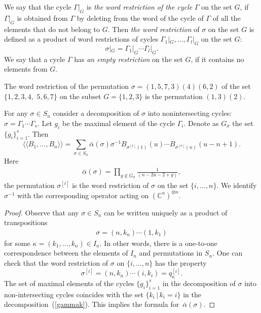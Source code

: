 \documentclass[pdftex]{sigma}
\newcommand{\CC}{\mathbb C}    %
\begin{document}
\begin{definition}
We say that the cycle $\Gamma |_G$ is {\it {the word restriction of  the cycle}}  $\Gamma$ on the set $G$, if~$\Gamma |_G$ is obtained from $\Gamma$ by deleting   from the  word of the cycle of $\Gamma$ of all the elements that do not belong to  $G$.
Then {\it {the word restriction}} of $\sigma$ on the set $G$ is def\/ined as a product of word restrictions of cycles $\Gamma_1|_G, \dots, \Gamma_l|_G $ on the set $G$:
\[
\sigma|_G=
\Gamma_1|_G \cdots \Gamma_l|_G.
\]
We say that a cycle $\Gamma$  has {\it{an empty restriction}} on the set $G$, if it contains no elements from $G$.
 \end{definition}
 \begin{example} The word restriction of the permutation $\sigma =(1,5,7,3)(4)(6,2)$ of the set $\{1,2,3,4,$ $5,6,7\}$ on the subset $G=\{1,2,3\}$
 is  the permutation $(1,3)(2)$.
 \end{example}

\begin{proposition}\label{QC}  For any  $\sigma\in S_n$ consider  a decomposition of $\sigma$  into nonintersecting cycles:
$\sigma = \Gamma_1\cdots \Gamma_s$.
Let $g_i$ be the maximal element of the cycle $\Gamma_i$.   Denote as $G_\sigma$ the set $\{g_i\}_{i=1}^{s}$.
Then
\[
\langle \langle B_1,\dots, B_n\rangle \rangle
=\sum_{\sigma \in S_n }\bar\alpha{(\sigma)} \sigma^{-1} B_{\sigma^{[1]}(1)}(u)\cdots B_{\sigma^{[n]}(n)}(u-n+1).
\]
Here
\begin{gather*}%
\bar\alpha{(\sigma)}=
\prod_{g\notin G_\sigma} \frac{1}{ (n-2u-2+g)},
\end{gather*}
the permutation $\sigma^{[i]}$ is the word restriction of  $\sigma$ on the set $\{i, \dots, n\}$. We identify $\sigma^{-1}$  with the corresponding operator acting on $(\CC^n)^{\otimes n}$.
\end{proposition}


\begin{proof}
Observe that any $\sigma\in S_n $ can be written  uniquely as a product of transpositions
\begin{gather}\label{gammak}
\sigma=(n,k_n)\cdots (1,k_1)
\end{gather}
 for some $\kappa=(k_1,\dots, k_n)\in I_n$. In other words, there  is a one-to-one correspondence between the elements of $I_n$  and permutations in $S_n$. One can check that the word restriction  of $\sigma$ on $\{i,\dots,n\}$  has the property
\[
\sigma^{[i]}=(n,k_n)\cdots (i,k_i)=q^{[i]}_{\kappa}.
\]
The set of   maximal elements  of the cycles  $\{g_{i}\}_{i=1}^{s}$  in the decomposition of $\sigma$ into non-intersecting cycles  coincides with the set $\{k_i\,| \, k_i=i\}$ in  the decomposition~(\ref{gammak}). This implies the formula for~$\bar\alpha(\sigma)$.
\end{proof}
\end{document}
